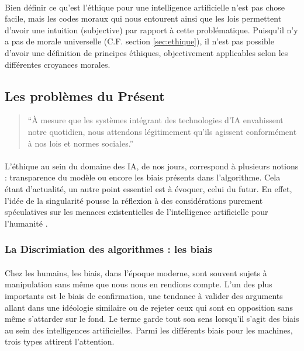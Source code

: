 \documentclass[10pt, french, a4paper]{report}
\begin{document}
\paragraph{}
Bien définir ce qu'est l'éthique pour une intelligence artificielle n'est pas chose facile, mais les codes moraux qui nous entourent ainsi que les lois permettent d'avoir une intuition (subjective) par rapport à cette problématique. Puisqu'il n'y a pas de morale universelle (C.F. section \ref{sec:ethique}), il n'est pas possible d'avoir une définition de principes éthiques, objectivement applicables selon les différentes croyances morales.


\subsection{Les problèmes du Présent}

\begin{quotation}
  ``À mesure que les systèmes intégrant des technologies d’IA envahissent notre quotidien, nous attendons légitimement qu’ils agissent conformément à nos lois et normes sociales.''
\end{quotation}

\paragraph{}
L’éthique au sein du domaine des IA, de nos jours, correspond à plusieurs notions : transparence du modèle ou encore les biais présents dans l’algorithme. Cela étant d’actualité, un autre point essentiel est à évoquer, celui du futur. En effet, l’idée de la singularité pousse la réflexion à des considérations purement spéculatives sur les menaces existentielles de l’intelligence artificielle pour l’humanité \citep{villani_donner_2018}.

\subsubsection{La Discrimiation des algorithmes : les biais}
\label{subsec:biais}

\paragraph{}
Chez les humains, les biais, dans l’époque moderne, sont souvent sujets à manipulation sans même que nous nous en rendions compte. L’un des plus importants est le biais de confirmation, une tendance à valider des arguments allant dans une idéologie similaire ou de rejeter ceux qui sont en opposition sans même s’attarder sur le fond. Le terme garde tout son sens lorsqu’il s’agit des biais au sein des intelligences artificielles. Parmi les différents biais pour les machines, trois types attirent l’attention.
\end{document}
